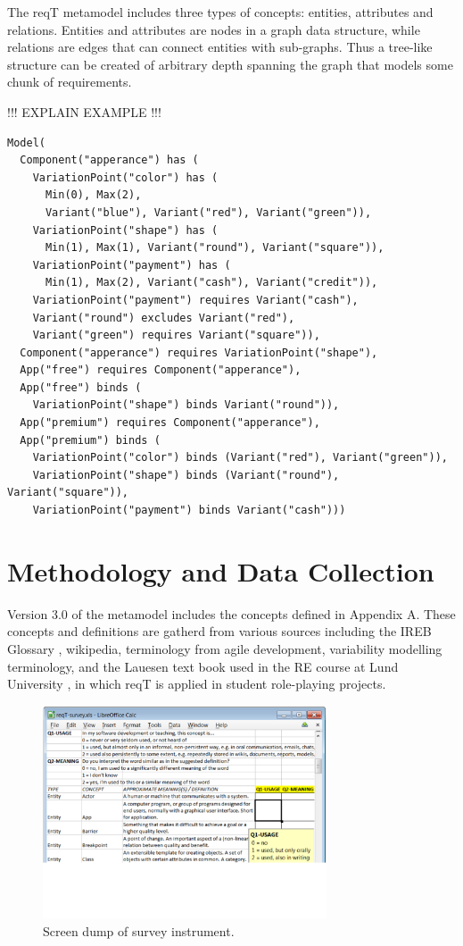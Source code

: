 \documentclass[a4paper]{llncs}
\begin{document}
The reqT metamodel includes three types of concepts: entities, attributes and relations. Entities and attributes are nodes in a graph data structure, while relations are edges that can connect entities with sub-graphs. Thus a tree-like structure can be created of arbitrary depth spanning the graph that models some chunk of requirements. 

!!! EXPLAIN EXAMPLE !!!
\begin{spacing}{0.8}
\begingroup
    \fontsize{8pt}{12pt}\selectfont
\begin{lstlisting}
Model(
  Component("apperance") has (
    VariationPoint("color") has (
      Min(0), Max(2),
      Variant("blue"), Variant("red"), Variant("green")),
    VariationPoint("shape") has (
      Min(1), Max(1), Variant("round"), Variant("square")),
    VariationPoint("payment") has (
      Min(1), Max(2), Variant("cash"), Variant("credit")),
    VariationPoint("payment") requires Variant("cash"), 
    Variant("round") excludes Variant("red"),
    Variant("green") requires Variant("square")),
  Component("apperance") requires VariationPoint("shape"), 
  App("free") requires Component("apperance"),  
  App("free") binds (
    VariationPoint("shape") binds Variant("round")),
  App("premium") requires Component("apperance"),  
  App("premium") binds ( 
    VariationPoint("color") binds (Variant("red"), Variant("green")),
    VariationPoint("shape") binds (Variant("round"), Variant("square")),
    VariationPoint("payment") binds Variant("cash")))
\end{lstlisting}
\endgroup
\end{spacing}




\section{Methodology and Data Collection}
Version 3.0 of the metamodel includes the concepts defined in Appendix A. These concepts and definitions are gatherd from various sources including the IREB Glossary \cite{IREB}, wikipedia, terminology from agile development, variability modelling terminology, and the Lauesen text book \cite{Lauesen2002} used in the RE course at Lund University \cite{ets170}, in which reqT is applied in student role-playing projects. 
\begin{figure}[h]
\centering
\includegraphics[width=0.75\textwidth]{img/survey-screen-dump}
\caption{Screen dump of survey instrument.}
\end{figure}
\end{document}
